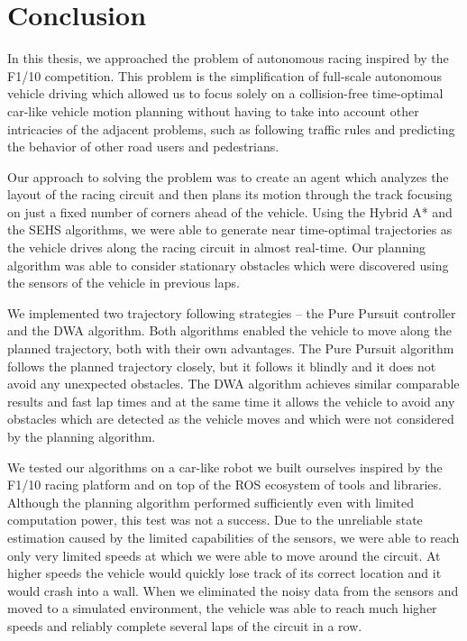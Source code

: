 \chapter*{Conclusion}

In this thesis, we approached the problem of autonomous racing inspired by the F1/10 competition. This problem is the simplification of full-scale autonomous vehicle driving which allowed us to focus solely on a collision-free time-optimal car-like vehicle motion planning without having to take into account other intricacies of the adjacent problems, such as following traffic rules and predicting the behavior of other road users and pedestrians.

Our approach to solving the problem was to create an agent which analyzes the layout of the racing circuit and then plans its motion through the track focusing on just a fixed number of corners ahead of the vehicle. Using the Hybrid A* and the \gls{SEHS} algorithms, we were able to generate near time-optimal trajectories as the vehicle drives along the racing circuit in almost real-time. Our planning algorithm was able to consider stationary obstacles which were discovered using the sensors of the vehicle in previous laps.

We implemented two trajectory following strategies – the Pure Pursuit controller and the \gls{DWA} algorithm. Both algorithms enabled the vehicle to move along the planned trajectory, both with their own advantages. The Pure Pursuit algorithm follows the planned trajectory closely, but it follows it blindly and it does not avoid any unexpected obstacles. The \gls*{DWA} algorithm achieves similar comparable results and fast lap times and at the same time it allows the vehicle to avoid any obstacles which are detected as the vehicle moves and which were not considered by the planning algorithm.

We tested our algorithms on a car-like robot we built ourselves inspired by the F1/10 racing platform and on top of the \gls{ROS} ecosystem of tools and libraries. Although the planning algorithm performed sufficiently even with limited computation power, this test was not a success. Due to the unreliable state estimation caused by the limited capabilities of the sensors, we were able to reach only very limited speeds at which we were able to move around the circuit. At higher speeds the vehicle would quickly lose track of its correct location and it would crash into a wall. When we eliminated the noisy data from the sensors and moved to a simulated environment, the vehicle was able to reach much higher speeds and reliably complete several laps of the circuit in a row.

